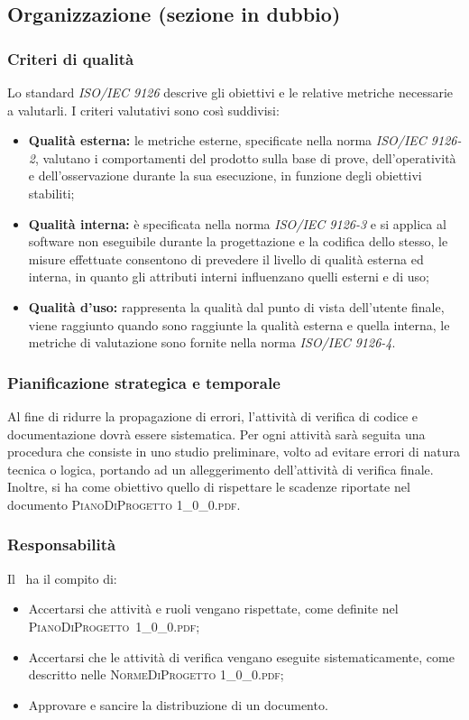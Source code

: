 	\subsection{Organizzazione (sezione in dubbio)}
		\subsubsection{Criteri di qualità}
		Lo standard \textit{ISO/IEC 9126} descrive gli obiettivi e le relative metriche necessarie a valutarli.
		I criteri valutativi sono così suddivisi:
		\begin{itemize}
			\item \textbf{Qualità esterna:} le metriche esterne, specificate nella norma \textit{ISO/IEC 9126-2}, valutano i comportamenti del prodotto sulla base di prove, dell'operatività e dell'osservazione durante la sua esecuzione, in funzione degli obiettivi stabiliti;
			\item \textbf{Qualità interna:} è specificata nella norma \textit{ISO/IEC 9126-3} e si applica al software non eseguibile
			durante la progettazione e la codifica dello stesso, le misure effettuate consentono di prevedere il livello di qualità esterna ed interna, in quanto gli attributi interni influenzano quelli esterni e di uso;
			\item \textbf{Qualità d'uso:} rappresenta la qualità dal punto di vista dell'utente finale, viene raggiunto quando sono raggiunte la qualità esterna e quella interna, le metriche di valutazione sono fornite nella norma \textit{ISO/IEC 9126-4}.
		\end{itemize}
	
		\subsubsection{Pianificazione strategica e temporale}
		Al fine di ridurre la propagazione di errori, l’attività di verifica di codice e documentazione dovrà essere sistematica. 
		Per ogni attività sarà seguita una procedura che consiste in uno studio preliminare, volto ad evitare errori di natura tecnica o logica, portando ad un alleggerimento dell'attività di verifica finale.
		Inoltre, si ha come obiettivo quello di rispettare le scadenze riportate nel documento \textsc{PianoDiProgetto 1\_0\_0.pdf}.
			
		\subsubsection{Responsabilità}
		Il \textit{\RdP}\ ha il compito di:
		\begin{itemize}
			\item Accertarsi che attività e ruoli vengano rispettate, come definite nel \hbox{\textsc{PianoDiProgetto 1\_0\_0.pdf}};
			\item Accertarsi che le attività di verifica vengano eseguite sistematicamente, come descritto nelle \textsc{NormeDiProgetto 1\_0\_0.pdf};
			\item Approvare e sancire la distribuzione di un documento.
		\end{itemize}
		
